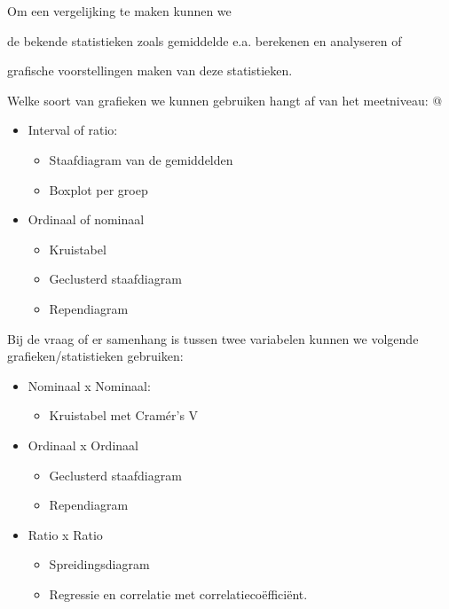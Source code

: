 Om een vergelijking te maken kunnen we \begin{inparaenum}[(i)]
\item de bekende statistieken zoals gemiddelde e.a. berekenen en analyseren of \item grafische voorstellingen maken van deze statistieken. \end{inparaenum}

Welke soort van grafieken we kunnen gebruiken hangt af van het meetniveau:
@
\begin{itemize}
  \item Interval of ratio:

    \begin{itemize}
      \item Staafdiagram van de gemiddelden
      \item Boxplot per groep
    \end{itemize}
  \item Ordinaal of nominaal

    \begin{itemize}
      \item Kruistabel
      \item Geclusterd staafdiagram
      \item Rependiagram
    \end{itemize}
\end{itemize}

Bij de vraag of er samenhang is tussen twee variabelen kunnen we volgende grafieken/statistieken gebruiken:

\begin{itemize}
  \item Nominaal x Nominaal:

    \begin{itemize}
      \item Kruistabel met Cramér's V
    \end{itemize}
  \item Ordinaal x Ordinaal
    \begin{itemize}
      \item Geclusterd staafdiagram
      \item Rependiagram
    \end{itemize}
  \item Ratio x Ratio

    \begin{itemize}
      \item Spreidingsdiagram
      \item Regressie en correlatie met correlatiecoëfficiënt.
    \end{itemize}
\end{itemize}

